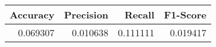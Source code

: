 \begin{tabular}{rrrr}
\toprule
 Accuracy &  Precision &   Recall &  F1-Score \\
\midrule
 0.069307 &   0.010638 & 0.111111 &  0.019417 \\
\bottomrule
\end{tabular}
